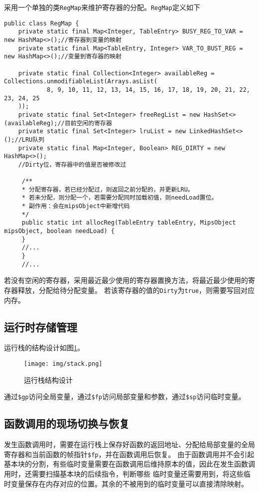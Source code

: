 采用一个单独的类\texttt{RegMap}来维护寄存器的分配。\texttt{RegMap}定义如下
\begin{verbatim}
public class RegMap {
    private static final Map<Integer, TableEntry> BUSY_REG_TO_VAR = new HashMap<>();//寄存器到变量的映射
    private static final Map<TableEntry, Integer> VAR_TO_BUST_REG = new HashMap<>();//变量到寄存器的映射

    private static final Collection<Integer> availableReg = Collections.unmodifiableList(Arrays.asList(
            8, 9, 10, 11, 12, 13, 14, 15, 16, 17, 18, 19, 20, 21, 22, 23, 24, 25
    ));
    private static final Set<Integer> freeRegList = new HashSet<>(availableReg);//目前空闲的寄存器
    private static final Set<Integer> lruList = new LinkedHashSet<>();//LRU队列
    private static final Map<Integer, Boolean> REG_DIRTY = new HashMap<>();
    //Dirty位，寄存器中的值是否被修改过

     /**
     * 分配寄存器，若已经分配过，则返回之前分配的，并更新LRU。
     * 若未分配，则分配一个，若需要分配同时加载初值，则needLoad置位。
     * 副作用：会在mipsObject中新增代码
     */
     public static int allocReg(TableEntry tableEntry, MipsObject mipsObject, boolean needLoad) {
     }
     //...
     }
     //...
\end{verbatim}

若没有空闲的寄存器，采用最近最少使用的寄存器置换方法，将最近最少使用的寄存器释放，分配给待分配变量。
若该寄存器的值的\texttt{Dirty}为\texttt{true}，则需要写回对应内存。

\subsection{运行时存储管理}
运行栈的结构设计如图\ref{fig:stack}。
\begin{figure}[htbp]
	\centering
	\texttt{[image: img/stack.png]}
	\caption{运行栈结构设计}
	\label{fig:stack}
\end{figure}


通过\texttt{\$gp}访问全局变量，通过\texttt{\$fp}访问局部变量和参数，通过\texttt{\$sp}访问临时变量。

\subsection{函数调用的现场切换与恢复}

发生函数调用时，需要在运行栈上保存好函数的返回地址、分配给局部变量的全局寄存器和当前函数的帧指针\texttt{\$fp}，并在函数调用后恢复。
由于函数调用并不会引起基本块的分割，有些临时变量需要在函数调用后维持原本的值，因此在发生函数调用时，还需要扫描基本块的后续指令，判断哪些
临时变量还需要用到，将这些临时变量保存在内存对应的位置。其余的不被用到的临时变量可以直接清除映射。

